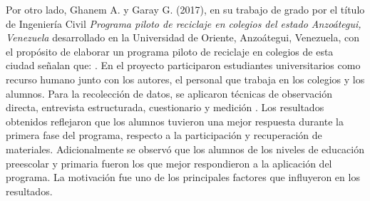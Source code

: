 Por otro lado, Ghanem A. y Garay G. (2017), en su trabajo de grado por el título de Ingeniería Civil \textit{Programa piloto de reciclaje en colegios del estado Anzoátegui, Venezuela} desarrollado en la Universidad de Oriente, Anzoátegui, Venezuela, con el propósito de elaborar un programa piloto de reciclaje en colegios de esta ciudad señalan que: . En el proyecto participaron estudiantes universitarios como recurso humano junto con los autores, el personal que trabaja en los colegios y los alumnos. Para la recolección de datos, se aplicaron técnicas de observación directa, entrevista estructurada, cuestionario y medición . Los resultados obtenidos reflejaron que los alumnos tuvieron una mejor respuesta durante la primera fase del programa, respecto a la participación y recuperación de materiales. Adicionalmente se observó que los alumnos de los niveles de educación preescolar y primaria fueron los que mejor respondieron a la aplicación del programa. La motivación fue uno de los principales factores que influyeron en los resultados.

